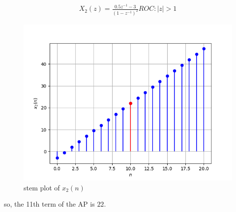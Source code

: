 \documentclass[journal,12pt,twocolumn]{IEEEtran}
\theoremstyle{remark}
\begin{document}
\begin{enumerate}
\begin{align}
X_2(z) = \frac{0.5z^{-1}-3}{(1-z^{-1})^2} {ROC : |z| > 1}
\end{align}


\begin{figure}[h!]
    \centering
    \includegraphics[width=\columnwidth]{figs/plot2.png}
    \caption{stem plot of $x_2(n)$}
    \label{fig:2}
\end{figure}
so, the 11th term of the AP is $22$.
\end{enumerate}
\end{document}

